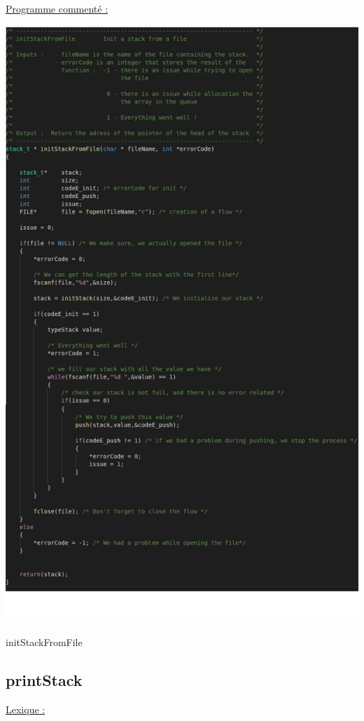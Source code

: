 \documentclass[a4paper]{article}
\begin{document}
\underline{Programme commenté :}
\begin{center}
\includegraphics[scale=0.4]{initStackFromFile.png}

initStackFromFile
\end{center}
\subsection{printStack}
\underline{Lexique :}
\end{document}
